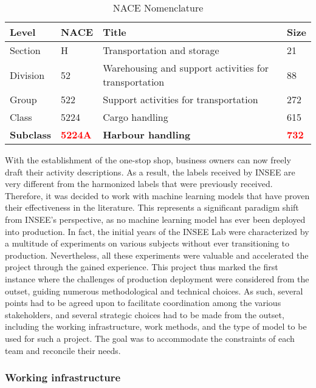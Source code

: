 \begin{table}[htbp]
    \centering
    \begin{tabular}{llll}
    \textbf{Level} & \textbf{NACE} & \textbf{Title} & \textbf{Size} \\ \hline
    Section & H & Transportation and storage & 21 \\ \hline
    Division & 52 & Warehousing and support activities for transportation & 88 \\ \hline
    Group & 522 & Support activities for transportation & 272 \\ \hline
    Class & 5224 & Cargo handling & 615 \\ \hline
    \textbf{Subclass} & \textbf{\textcolor{red}{5224A}} & \textbf{Harbour handling} & \textbf{\textcolor{red}{732}} \\ 
    \end{tabular}
    \caption{NACE Nomenclature}
    \label{tab:nace-nomenclature}
    \end{table}


With the establishment of the one-stop shop, business owners can now freely draft their activity descriptions. As a result, the labels received by INSEE are very different from the harmonized labels that were previously received. Therefore, it was decided to work with machine learning models that have proven their effectiveness in the literature. This represents a significant paradigm shift from INSEE's perspective, as no machine learning model has ever been deployed into production. In fact, the initial years of the INSEE Lab were characterized by a multitude of experiments on various subjects without ever transitioning to production. Nevertheless, all these experiments were valuable and accelerated the project through the gained experience. This project thus marked the first instance where the challenges of production deployment were considered from the outset, guiding numerous methodological and technical choices. As such, several points had to be agreed upon to facilitate coordination among the various stakeholders, and several strategic choices had to be made from the outset, including the working infrastructure, work methods, and the type of model to be used for such a project. The goal was to accommodate the constraints of each team and reconcile their needs.

\subsubsection{Working infrastructure}

